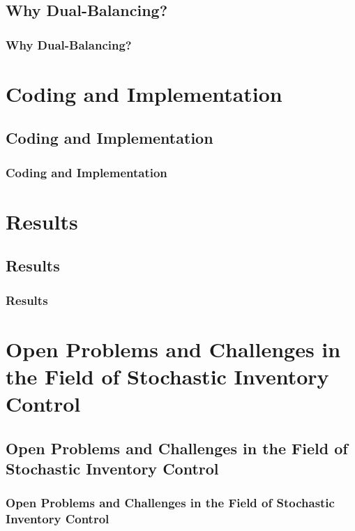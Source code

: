 \documentclass{beamer}
\begin{document}
    \subsection{Why Dual-Balancing?}
    \begin{frame}
    \frametitle{Why Dual-Balancing?}

    \end{frame}
  \section{Coding and Implementation}
    \subsection{Coding and Implementation}
    \begin{frame}
    \frametitle{Coding and Implementation}

    \end{frame}
  \section{Results}
    \subsection{Results}
    \begin{frame}

    \frametitle{Results}

    \end{frame}
  \section{Open Problems and Challenges in the Field of Stochastic Inventory Control}
    \subsection{Open Problems and Challenges in the Field of Stochastic Inventory Control}
    \begin{frame}
    \frametitle{Open Problems and Challenges in the Field of Stochastic Inventory Control}

    \end{frame}
\end{document}
